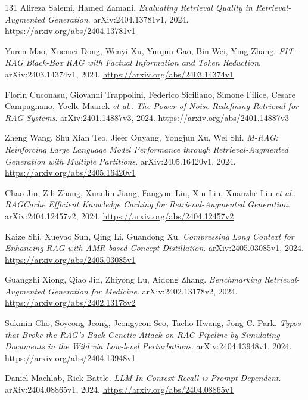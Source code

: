 \documentclass[11pt,a4paper]{article}
\begin{document}
\begin{thebibliography}{131}
Alireza Salemi, Hamed Zamani.
\newblock \emph{Evaluating Retrieval Quality in Retrieval-Augmented Generation}.
\newblock arXiv:2404.13781v1, 2024.
\newblock \url{https://arxiv.org/abs/2404.13781v1}

Yuren Mao, Xuemei Dong, Wenyi Xu, Yunjun Gao, Bin Wei, Ying Zhang.
\newblock \emph{FIT-RAG Black-Box RAG with Factual Information and Token Reduction}.
\newblock arXiv:2403.14374v1, 2024.
\newblock \url{https://arxiv.org/abs/2403.14374v1}

Florin Cuconasu, Giovanni Trappolini, Federico Siciliano, Simone Filice, Cesare Campagnano, Yoelle Maarek \emph{et al.}.
\newblock \emph{The Power of Noise Redefining Retrieval for RAG Systems}.
\newblock arXiv:2401.14887v3, 2024.
\newblock \url{https://arxiv.org/abs/2401.14887v3}

Zheng Wang, Shu Xian Teo, Jieer Ouyang, Yongjun Xu, Wei Shi.
\newblock \emph{M-RAG: Reinforcing Large Language Model Performance through Retrieval-Augmented Generation with Multiple Partitions}.
\newblock arXiv:2405.16420v1, 2024.
\newblock \url{https://arxiv.org/abs/2405.16420v1}

Chao Jin, Zili Zhang, Xuanlin Jiang, Fangyue Liu, Xin Liu, Xuanzhe Liu \emph{et al.}.
\newblock \emph{RAGCache Efficient Knowledge Caching for Retrieval-Augmented Generation}.
\newblock arXiv:2404.12457v2, 2024.
\newblock \url{https://arxiv.org/abs/2404.12457v2}

Kaize Shi, Xueyao Sun, Qing Li, Guandong Xu.
\newblock \emph{Compressing Long Context for Enhancing RAG with AMR-based Concept Distillation}.
\newblock arXiv:2405.03085v1, 2024.
\newblock \url{https://arxiv.org/abs/2405.03085v1}

Guangzhi Xiong, Qiao Jin, Zhiyong Lu, Aidong Zhang.
\newblock \emph{Benchmarking Retrieval-Augmented Generation for Medicine}.
\newblock arXiv:2402.13178v2, 2024.
\newblock \url{https://arxiv.org/abs/2402.13178v2}

Sukmin Cho, Soyeong Jeong, Jeongyeon Seo, Taeho Hwang, Jong C. Park.
\newblock \emph{Typos that Broke the RAG's Back Genetic Attack on RAG Pipeline by Simulating Documents in the Wild via Low-level Perturbations}.
\newblock arXiv:2404.13948v1, 2024.
\newblock \url{https://arxiv.org/abs/2404.13948v1}

Daniel Machlab, Rick Battle.
\newblock \emph{LLM In-Context Recall is Prompt Dependent}.
\newblock arXiv:2404.08865v1, 2024.
\newblock \url{https://arxiv.org/abs/2404.08865v1}


\end{thebibliography}
\end{document}
